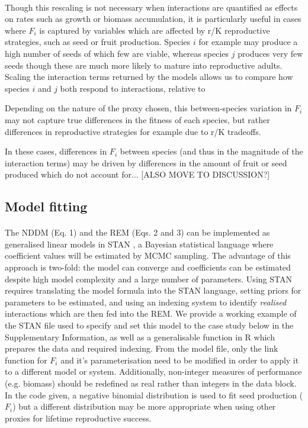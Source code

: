 \documentclass[a4,12pt]{article}
\begin{document}
        \paragraph{}
        Though this rescaling is not necessary when interactions are quantified as effects on rates such as growth or biomass accumulation, it is particularly useful in cases where $F_i$ is captured by variables which are affected by r/K reproductive strategies, such as seed or fruit production. Species $i$ for example may produce a high number of seeds of which few are viable, whereas species $j$ produces very few seeds though these are much more likely to mature into reproductive adults. Scaling the interaction terms returned by the models allows us to compare how species $i$ and $j$ both respond to interactions, relative to 

        Depending on the nature of the proxy chosen, this between-species variation in $F_i$ may not capture true differences in the fitness of each species, but rather differences in reproductive strategies for example due to r/K tradeoffs. 

        In these cases, differences in $F_i$ between species (and thus in the magnitude of the interaction terms) may be driven by differences in the amount of fruit or seed produced which do not account for...  [ALSO MOVE TO DISCUSSION?] 




    \subsection{Model fitting}

        \paragraph{}        
        The NDDM (Eq. 1) and the REM (Eqs. 2 and 3) can be implemented as generalised linear models in STAN \parencite{Carpenter2017}, a Bayesian statistical language where coefficient values will be estimated by MCMC sampling. The advantage of this approach is two-fold: the model can converge and coefficients can be estimated despite high model complexity and a large number of parameters. Using STAN requires translating the model formula into the STAN language, setting priors for parameters to be estimated, and using an indexing system to identify \textit{realised} interactions which are then fed into the REM. We provide a working example of the STAN file used to specify and set this model to the case study below in the Supplementary Information, as well as a generalisable function in R which prepares the data and required indexing. From the model file, only the link function for $F_i$ and it's parameterisation need to be modified in order to apply it to a different model or system. Additionally, non-integer measures of performance (e.g. biomass) should be redefined as real rather than integers in the data block. In the code given, a negative binomial distribution is used to fit seed production ($F_i$) but a different distribution may be more appropriate when using other proxies for lifetime reproductive success.   
\end{document}
